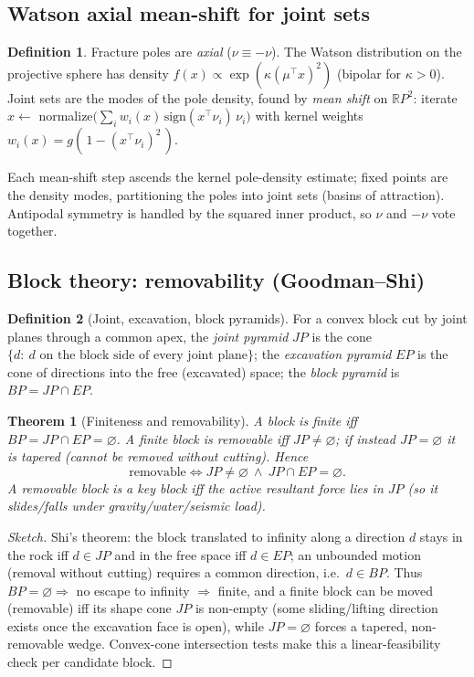 \documentclass[11pt]{article}
\theoremstyle{definition}\newtheorem{definition}{Definition}[section]
\theoremstyle{plain}\newtheorem{theorem}{Theorem}[section]
\newcommand{\R}{\mathbb{R}}\newcommand{\Z}{\mathbb{Z}}\newcommand{\Norm}[1]{\lVert #1\rVert}
\begin{document}
\subsection{Watson axial mean-shift for joint sets}
\begin{definition}
Fracture poles are \emph{axial} ($\nu\equiv-\nu$). The Watson distribution on the projective sphere has
density $f(x)\propto\exp(\kappa(\mu^\top x)^2)$ (bipolar for $\kappa>0$). Joint sets are the modes of the pole
density, found by \emph{mean shift} on $\R P^2$: iterate $x\leftarrow$ normalize$\big(\sum_i w_i(x)\,
\mathrm{sign}(x^\top\nu_i)\,\nu_i\big)$ with kernel weights $w_i(x)=g(\,1-(x^\top\nu_i)^2\,)$.
\end{definition}
\begin{proposition}
Each mean-shift step ascends the kernel pole-density estimate; fixed points are the density modes, partitioning
the poles into joint sets (basins of attraction). Antipodal symmetry is handled by the squared inner product,
so $\nu$ and $-\nu$ vote together.
\end{proposition}
\subsection{Block theory: removability (Goodman--Shi)}
\begin{definition}[Joint, excavation, block pyramids]
For a convex block cut by joint planes through a common apex, the \emph{joint pyramid} $JP$ is the cone
$\{d:\ \text{$d$ on the block side of every joint plane}\}$; the \emph{excavation pyramid} $EP$ is the cone of
directions into the free (excavated) space; the \emph{block pyramid} is $BP=JP\cap EP$.
\end{definition}
\begin{theorem}[Finiteness and removability]\label{thm:blocktheory}
A block is \emph{finite} iff $BP=JP\cap EP=\varnothing$. A finite block is \emph{removable} iff $JP\neq
\varnothing$; if instead $JP=\varnothing$ it is \emph{tapered} (cannot be removed without cutting). Hence
\[\text{removable}\iff JP\neq\varnothing\ \wedge\ JP\cap EP=\varnothing.\]
A removable block is a \emph{key block} iff the active resultant force lies in $JP$ (so it slides/falls under
gravity/water/seismic load).
\end{theorem}
\begin{proof}[Sketch]
Shi's theorem: the block translated to infinity along a direction $d$ stays in the rock iff $d\in JP$ and in
the free space iff $d\in EP$; an unbounded motion (removal without cutting) requires a common direction, i.e.\
$d\in BP$. Thus $BP=\varnothing\Rightarrow$ no escape to infinity $\Rightarrow$ finite, and a finite block can
be moved (removable) iff its shape cone $JP$ is non-empty (some sliding/lifting direction exists once the
excavation face is open), while $JP=\varnothing$ forces a tapered, non-removable wedge. Convex-cone
intersection tests make this a linear-feasibility check per candidate block.
\end{proof}
\end{document}
